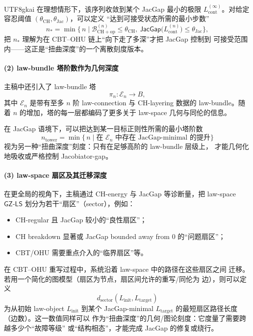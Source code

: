 \documentclass[12pt]{article}
\newcommand{\GZLS}{\ensuremath{\mathsf{GZ\mbox{-}LS}}}
\begin{document}
\begin{CJK*}{UTF8}{gkai}
在理想情形下，该序列收敛到某个 JacGap 最小的极限
$L_{\mathrm{cont}}^{(\infty)}$。对给定容忍阈值
$(\theta_{\mathrm{CH}},\theta_{\mathrm{Jac}})$，可以定义
“达到可接受状态所需的最小步数”
\[
  n_\ast
  =
  \min\bigl\{\,
    n\mid
    \mathcal{B}_{\mathrm{CH+op}}^{(n)}
    \le\theta_{\mathrm{CH}},
    \ \mathsf{JacGap}\bigl(L_{\mathrm{cont}}^{(n)}\bigr)
    \le\theta_{\mathrm{Jac}}
  \bigr\},
\]
把 $n_\ast$ 理解为在 CBT--OHU 链上“向下走了多深”才把 JacGap 控制到
可接受范围内——这正是“扭曲深度”的一个离散刻度版本。

\paragraph{(2) law-bundle 塔阶数作为几何深度}

主稿中还引入了 law-bundle 塔
\[
  \pi_n:\mathcal{E}_n\to B,
\]
其中 $\mathcal{E}_n$ 是带有至多 $n$ 阶 law-connection 与 CH-layering
数据的 law-bundle。随着 $n$ 的增加，塔的每一层都编码了更多关于
law-space 几何与同伦的信息。

在 JacGap 语境下，可以把达到某一目标正则性所需的最小塔阶数
\[
  n_{\mathrm{tower}}
  =
  \min\bigl\{\,n\mid
    \text{在 }\mathcal{E}_n\text{ 中存在 JacGap-minimal 的提升}
  \bigr\}
\]
视为另一种“扭曲深度”刻度：只有在足够高阶的 law-bundle 层级上，
才能几何化地吸收或严格控制 Jacobiator-gap。

\paragraph{(3) law-space 扇区及其迁移深度}

在更全局的视角下，主稿通过 CH-energy 与 JacGap 等诊断量，把
law-space $\GZLS$ 划分为若干“扇区”（sector），例如：
\begin{itemize}
  \item CH-regular 且 JacGap 较小的“良性扇区”；
  \item CH breakdown 显著或 JacGap bounded away from $0$ 的“问题扇区”；
  \item CBT/OHU 需要重点介入的“临界扇区”等。
\end{itemize}
在 CBT--OHU 重写过程中，系统沿着 law-space 中的路径在这些扇区之间
迁移。若用一个简化的图模型（扇区为节点，扇区间允许的重写/同伦为
边），则可以定义
\[
  d_{\mathrm{sector}}(L_{\mathrm{init}},L_{\mathrm{target}})
\]
为从初始 law-object $L_{\mathrm{init}}$ 到某个 JacGap-minimal
$L_{\mathrm{target}}$ 的最短扇区路径长度（边数）。这一数值同样可以
作为“扭曲深度”的几何/图论刻度：它度量了需要跨越多少个“故障等级”
或“结构相态”，才能完成 JacGap 的修复或绕行。


\end{CJK*}
\end{document}
